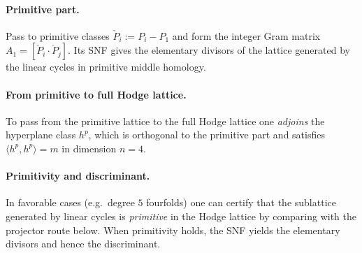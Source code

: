 \documentclass[11pt]{article}
\theoremstyle{definition}
\begin{document}
\paragraph{Primitive part.} Pass to primitive classes \( \check P_i:=P_i-P_1\) and form the integer Gram matrix \(A_1=[\check P_i\cdot \check P_j]\). Its SNF gives the elementary divisors of the lattice generated by the linear cycles in primitive middle homology.

\paragraph{From primitive to full Hodge lattice.}
To pass from the primitive lattice to the full Hodge lattice one \emph{adjoins} the hyperplane class \(h^p\), which is orthogonal to the primitive part and satisfies \(\langle h^p,h^p\rangle = m\) in dimension \(n=4\).

\paragraph{Primitivity and discriminant.}
In favorable cases (e.g.\ degree \(5\) fourfolds) one can certify that the sublattice generated by linear cycles is \emph{primitive} in the Hodge lattice by comparing with the projector route below. When primitivity holds, the SNF yields the elementary divisors and hence the discriminant.
\end{document}
